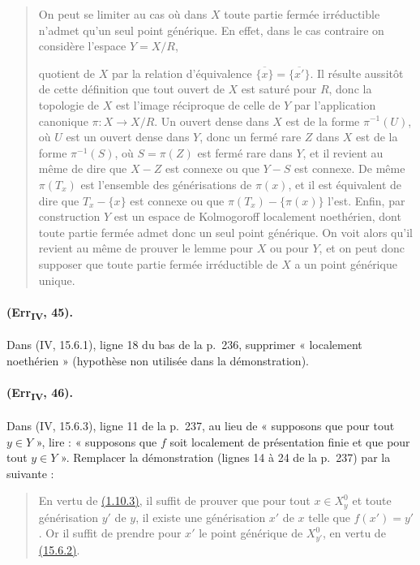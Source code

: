 \begin{quote}
On peut se limiter au cas où dans $X$ toute partie fermée irréductible
n'admet qu'un seul point générique. En effet, dans le cas contraire on
considère l'espace $Y=X/R$,

quotient de $X$ par la relation d'équivalence
$\overline{\{x\}}=\overline{\{x'\}}$. Il résulte aussitôt de cette
définition que tout ouvert de $X$ est saturé pour $R$, donc la topologie
de $X$ est l'image réciproque de celle de $Y$ par l'application
canonique $\pi:X\to X/R$. Un ouvert dense dans $X$ est de la forme
$\pi^{-1}(U)$, où $U$ est un ouvert dense dans $Y$, donc un fermé rare
$Z$ dans $X$ est de la forme $\pi^{-1}(S)$, où $S=\pi(Z)$ est fermé
rare dans $Y$, et il revient au même de dire que $X-Z$ est connexe ou
que $Y-S$ est connexe. De même $\pi(T_x)$ est l'ensemble des
générisations de $\pi(x)$, et il est équivalent de dire que
$T_x-\{x\}$ est connexe ou que $\pi(T_x)-\{\pi(x)\}$ l'est. Enfin, par
construction $Y$ est un espace de Kolmogoroff localement noethérien,
dont toute partie fermée admet donc un seul point générique. On voit
alors qu'il revient au même de prouver le lemme pour $X$ ou pour $Y$,
et on peut donc supposer que toute partie fermée irréductible de $X$ a
un point générique unique.
\end{quote}

\paragraph{(Err\textsubscript{IV}, 45).}
Dans (IV, 15.6.1), ligne 18 du bas de la p.~236, supprimer « localement
noethérien » (hypothèse non utilisée dans la démonstration).

\paragraph{(Err\textsubscript{IV}, 46).}
Dans (IV, 15.6.3), ligne 11 de la p.~237, au lieu de « supposons que
pour tout $y\in Y$ », lire : « supposons que $f$ soit localement de
présentation finie et que pour tout $y\in Y$ ». Remplacer la
démonstration (lignes 14 à 24 de la p.~237) par la suivante :
\begin{quote}
En vertu de {\hyperref[canon-index.ega4.c04.prop.1-10-3]{(1.10.3)}}, il suffit de
prouver que pour tout $x\in X_y^0$ et toute générisation $y'$ de $y$,
il existe une générisation $x'$ de $x$ telle que $f(x')=y'$. Or il
suffit de prendre pour $x'$ le point générique de $X_{y'}^0$, en vertu
de {\hyperref[canon-index.ega4.c04.cor.15-6-2]{(15.6.2)}}.
\end{quote}

